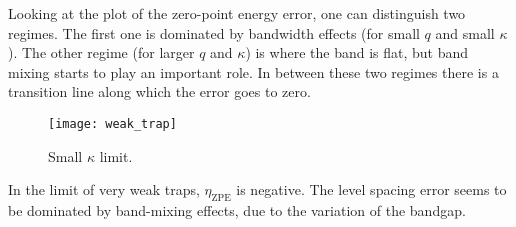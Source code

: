 \documentclass[twocolumn, 10pt, aps, superscriptaddress, floatfix, showpacs, prb, citeautoscript]{revtex4-1}
\begin{document}
Looking at the plot of the zero-point energy error, one can
distinguish two regimes. The first one is dominated by bandwidth
effects (for small $q$ and small $\kappa$). The other regime (for
larger $q$ and $\kappa$) is where the band is flat, but band mixing
starts to play an important role. In between these two regimes there
is a transition line along which the error goes to zero.


\begin{figure}[htb]\centering
  \texttt{[image: weak\_trap]}
  \caption{Small $\kappa$ limit.}
  \label{fig:error_small_kappa}
\end{figure}


In the limit of very weak traps, $\eta_{\text{ZPE}}$ is negative.
The level spacing error seems to be dominated by band-mixing effects, due to the variation of the bandgap.
\end{document}
